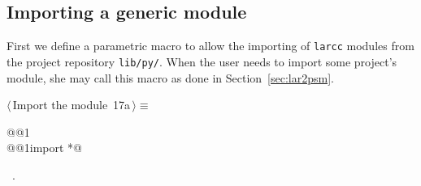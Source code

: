 \documentclass[11pt,oneside]{article}	%
\begin{document}
\subsection{Importing a generic module}
First we define a parametric macro to allow the importing of \texttt{larcc} modules from the project repository \texttt{lib/py/}. When the user needs to import some project's module, she may call this macro as done in Section~\ref{sec:lar2psm}.
\begin{flushleft} \small
\begin{minipage}{\linewidth} \label{scrap31}
\protect{}$\langle\,$Import the module\nobreak\ {\footnotesize 17a}$\,\rangle\equiv$
\vspace{-1ex}
\begin{list}{}{} \item
\mbox{}\verb@import @@1\verb@@\\
\mbox{}\verb@from @@1\verb@ import *@\\
\mbox{}\verb@@{\NWsep}
\end{list}
\vspace{-1ex}
\footnotesize\addtolength{\baselineskip}{-1ex}
\begin{list}{}{\setlength{\itemsep}{-\parsep}\setlength{\itemindent}{-\leftmargin}}
\item \NWtxtMacroRefIn\ .
\end{list}
\end{minipage}\\[4ex]
\end{flushleft}
\end{document}
